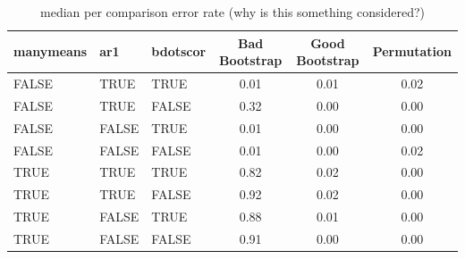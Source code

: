 \documentclass{article}
\begin{document}
\begin{table}[H]
\centering
\begin{tabular}{lllccc}
  \hline
  manymeans & ar1 & bdotscor &  Bad Bootstrap & Good Bootstrap & Permutation  \\ 
  \hline
FALSE & TRUE & TRUE & 0.01 & 0.01 & 0.02 \\ 
  FALSE & TRUE & FALSE & 0.32 & 0.00 & 0.00 \\ 
  FALSE & FALSE & TRUE & 0.01 & 0.00 & 0.00 \\ 
  FALSE & FALSE & FALSE & 0.01 & 0.00 & 0.02 \\ 
  TRUE & TRUE & TRUE & 0.82 & 0.02 & 0.00 \\ 
  TRUE & TRUE & FALSE & 0.92 & 0.02 & 0.00 \\ 
  TRUE & FALSE & TRUE & 0.88 & 0.01 & 0.00 \\ 
  TRUE & FALSE & FALSE & 0.91 & 0.00 & 0.00 \\ 
\hline
\end{tabular}
\caption{median per comparison error rate (why is this something considered?)}
\end{table}
\end{document}
